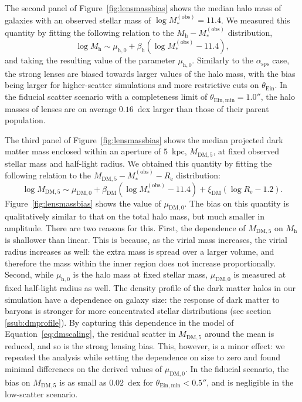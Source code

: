 \documentclass{aa}
\def\reff{R_{\mathrm{e}}}
\def\asps{\alpha_{\mathrm{sps}}}
\def\mobs{M_*^{(\mathrm{obs})}}
\def\mdmfive{M_{\mathrm{DM}, 5}}
\def\mhalo{M_{\mathrm{h}}}
\def\tein{\theta_{\mathrm{Ein}}}
\def\Fref#1{Figure~\ref{#1}\xspace}
\def\Eref#1{Equation~\ref{#1}\xspace}
\begin{document}
The second panel of \Fref{fig:lensmassbias} shows the median halo mass of galaxies with an observed stellar mass of $\log{\mobs}=11.4$.
We measured this quantity by fitting the following relation to the $\mhalo-\mobs$ distribution,
\begin{equation}
\log{\mhalo} \sim \mu_{\mathrm{h},0} + \beta_{\mathrm{h}}(\log{\mobs} - 11.4),
\end{equation}
and taking the resulting value of the parameter $\mu_{\mathrm{h},0}$.
Similarly to the $\asps$ case, the strong lenses are biased towards larger values of the halo mass, with the bias being larger for higher-scatter simulations and more restrictive cuts on $\tein$.
In the fiducial scatter scenario with a completeness limit of $\theta_{\mathrm{Ein,min}}=1.0''$, the halo masses of lenses are on average $0.16$~dex larger than those of their parent population.

The third panel of \Fref{fig:lensmassbias} shows the median projected dark matter mass enclosed within an aperture of $5$~kpc, $\mdmfive$, at fixed observed stellar mass and half-light radius.
We obtained this quantity by fitting the following relation to the $\mdmfive-\mobs-\reff$ distribution:
\begin{equation}\label{eq:dmscaling}
\log{\mdmfive} \sim \mu_{\mathrm{DM},0} + \beta_{\mathrm{DM}}(\log{\mobs} - 11.4) + \xi_{\mathrm{DM}}(\log{\reff} - 1.2).
\end{equation}
\Fref{fig:lensmassbias} shows the value of $\mu_{\mathrm{DM},0}$.
The bias on this quantity is qualitatively similar to that on the total halo mass, but much smaller in amplitude.
There are two reasons for this.
First, the dependence of $\mdmfive$ on $\mhalo$ is shallower than linear. This is because, as the virial mass increases, the virial radius increases as well: the extra mass is spread over a larger volume, and therefore the mass within the inner region does not increase proportionally.
Second, while $\mu_{\mathrm{h},0}$ is the halo mass at fixed stellar mass, $\mu_{\mathrm{DM},0}$ is measured at fixed half-light radius as well.
The density profile of the dark matter halos in our simulation have a dependence on galaxy size: the response of dark matter to baryons is stronger for more concentrated stellar distributions (see section \ref{ssub:dmprofile}).
By capturing this dependence in the model of \Eref{eq:dmscaling}, the residual scatter in $\mdmfive$ around the mean is reduced, and so is the strong lensing bias.
This, however, is a minor effect: we repeated the analysis while setting the dependence on size to zero and found minimal differences on the derived values of $\mu_{\mathrm{DM},0}$.
%
In the fiducial scenario, the bias on $\mdmfive$ is as small as $0.02$~dex for $\theta_{\mathrm{Ein,min}} < 0.5''$, and is negligible in the low-scatter scenario.
\end{document}
